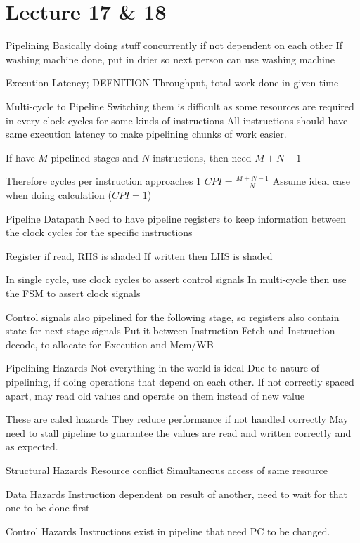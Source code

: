 \documentclass{article}
\begin{document}
\section*{Lecture 17 \& 18}
	Pipelining
		Basically doing stuff concurrently if not dependent on each other
		If washing machine done, put in drier so next person can use washing machine

		Execution Latency; DEFNITION
		Throughput, total work done in given time

	Multi-cycle to Pipeline
		Switching them is difficult as some resources are required in every clock cycles for some kinds of instructions
		All instructions should have same execution latency to make pipelining chunks of work easier.

		If have $M$ pipelined stages and $N$ instructions, then need $M + N - 1$

		Therefore cycles per instruction approaches 1
		$CPI = \frac{M + N - 1}{N}$
		Assume ideal case when doing calculation ($CPI = 1$)

	Pipeline Datapath
		Need to have pipeline registers to keep information between the clock cycles for the specific instructions

		Register if read, RHS is shaded
		If written then LHS is shaded

		In single cycle, use clock cycles to assert control signals
		In multi-cycle then use the FSM to assert clock signals

		Control signals also pipelined for the following stage, so registers also contain state for next stage signals
		Put it between Instruction Fetch and Instruction decode, to allocate for Execution and Mem/WB

	Pipelining Hazards
		Not everything in the world is ideal
		Due to nature of pipelining, if doing operations that depend on each other. If not correctly spaced apart, may read old values and operate on them instead of new value

		These are caled hazards
		They reduce performance if not handled correctly
		May need to stall pipeline to guarantee the values are read and written correctly and as expected.


		Structural Hazards
			Resource conflict
			Simultaneous access of same resource

		Data Hazards
			Instruction dependent on result of another, need to wait for that one to be done first

		Control Hazards
			Instructions exist in pipeline that need PC to be changed.
\end{document}
